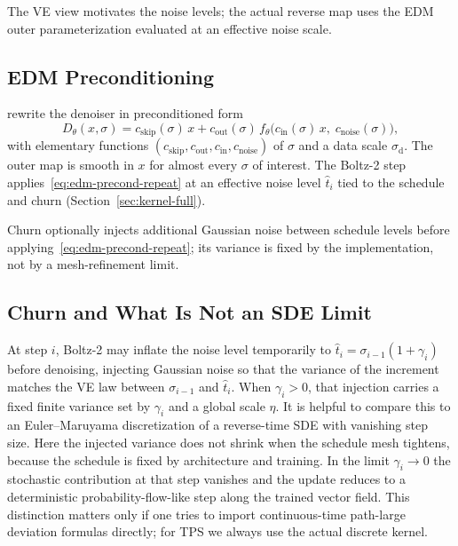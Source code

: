 The VE view motivates the noise levels; the actual reverse map uses the EDM
outer parameterization evaluated at an effective noise scale.

\subsection{EDM Preconditioning}

\citet{karras2022} rewrite the denoiser in preconditioned form
\begin{equation}
  \label{eq:edm-precond-repeat}
  D_\theta(x, \sigma)
  = c_{\mathrm{skip}}(\sigma)\,x
  + c_{\mathrm{out}}(\sigma)\,
    f_\theta\bigl(c_{\mathrm{in}}(\sigma)\,x,\; c_{\mathrm{noise}}(\sigma)\bigr),
\end{equation}
with elementary functions $(c_{\mathrm{skip}}, c_{\mathrm{out}}, c_{\mathrm{in}}, c_{\mathrm{noise}})$ of $\sigma$ and a data scale $\sigma_{\mathrm{d}}$. The outer map is smooth in $x$ for almost every $\sigma$ of interest. The Boltz-2 step applies~\eqref{eq:edm-precond-repeat} at an effective noise level $\hat{t}_i$ tied to the schedule and churn (Section~\ref{sec:kernel-full}).

Churn optionally injects additional Gaussian noise between schedule levels before
applying~\eqref{eq:edm-precond-repeat}; its variance is fixed by the implementation,
not by a mesh-refinement limit.

\subsection{Churn and What Is Not an SDE Limit}

At step $i$, Boltz-2 may inflate the noise level temporarily to $\hat{t}_i = \sigma_{i-1}(1+\gamma_i)$ before denoising, injecting Gaussian noise so that the variance of the increment matches the VE law between $\sigma_{i-1}$ and $\hat{t}_i$. When $\gamma_i>0$, that injection carries a fixed finite variance set by $\gamma_i$ and a global scale $\eta$. It is helpful to compare this to an Euler--Maruyama discretization of a reverse-time SDE with vanishing step size. Here the injected variance does not shrink when the schedule mesh tightens, because the schedule is fixed by architecture and training. In the limit $\gamma_i \to 0$ the stochastic contribution at that step vanishes and the update reduces to a deterministic probability-flow-like step along the trained vector field. This distinction matters only if one tries to import continuous-time path-large deviation formulas directly; for TPS we always use the actual discrete kernel.

